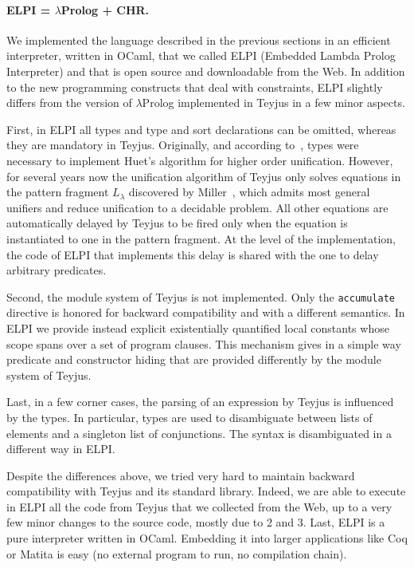 \documentclass{easychair}
\begin{document}
\paragraph{ELPI = $\lambda$Prolog + CHR.}\label{sec:elpi}

We implemented the language described in the previous sections in an efficient interpreter, written in OCaml, that we called ELPI (Embedded Lambda Prolog Interpreter) and that is open source and downloadable from the Web.
In addition to the new programming constructs that deal with
constraints, ELPI slightly differs from the version of $\lambda$Prolog
implemented in Teyjus in a few minor aspects.

First, in ELPI all types and type and sort declarations can be omitted, whereas
	they are mandatory in Teyjus. Originally, and according
	to~\cite{jlp98}, types were necessary to implement Huet's algorithm for
	higher order unification. However, for several years now the
	unification algorithm of Teyjus only solves equations in the pattern
	fragment $L_\lambda$ discovered by Miller~\cite{patternfrag}, which admits most
	general unifiers and reduce unification to a decidable problem. All
	other equations are automatically delayed by Teyjus to be fired only
	when the equation is instantiated to one in the pattern fragment. At
	the level of the implementation, the code of ELPI that implements this
	delay is shared with the one to delay arbitrary predicates.

Second, the module system of Teyjus is not implemented. Only the
	\verb+accumulate+ directive is honored for backward compatibility and
	with a different semantics. In ELPI we provide instead explicit
	existentially quantified local constants whose scope spans over a set
	of program clauses. This mechanism gives in a simple way predicate and
	constructor hiding that are provided differently by the module system
	of Teyjus.

	Last, in a few corner cases, the parsing of an expression by Teyjus is
	influenced by the types. In particular, types are used to disambiguate
	between lists of elements and a singleton list of conjunctions. The
	syntax is disambiguated in a different way in ELPI.

Despite the differences above, we tried very hard to maintain backward
compatibility with Teyjus and its standard library. Indeed, we are able to
execute in ELPI all the code from Teyjus that we collected from the Web, up to
a very few minor changes to the source code, mostly due to 2 and 3.
Last, ELPI is a pure interpreter written in OCaml.  Embedding it into
larger applications like Coq or Matita is easy (no external program to
run, no compilation chain).
\end{document}

